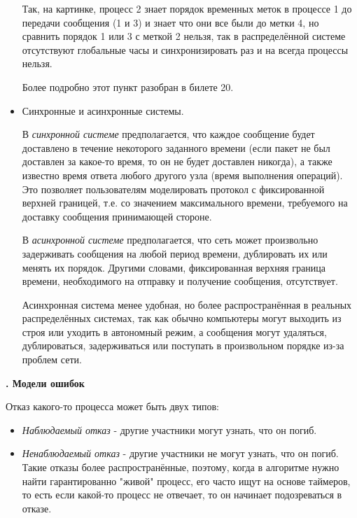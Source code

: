 \begin{itemize}
Так, на картинке, процесс 2 знает порядок временных меток в процессе 1 до передачи сообщения (1 и 3) и знает что они все были до метки 4, но сравнить порядок 1 или 3 с меткой 2 нельзя, так в распределённой системе отсутствуют глобальные часы и синхронизировать раз и на всегда процессы нельзя.
 
 Более подробно этот пункт разобран в билете 20.
 
\item  Синхронные и асинхронные системы.

\hspace{12px}В \textit{синхронной системе} предполагается, что каждое сообщение будет доставлено в течение некоторого заданного времени (если пакет не был доставлен за какое-то время, то он не будет доставлен никогда), а также известно время ответа любого другого узла (время выполнения операций).
Это позволяет пользователям моделировать протокол с фиксированной верхней границей, т.е. со значением максимального времени, требуемого на доставку сообщения принимающей стороне.

\hspace{12px}В \textit{асинхронной системе} предполагается, что сеть может произвольно задерживать сообщения на любой период времени, дублировать их или менять их порядок. Другими словами, фиксированная верхняя граница времени, необходимого на отправку и получение сообщения, отсутствует.

\hspace{12px} Асинхронная система менее удобная, но более распространённая в реальных распределённых системах, так как обычно компьютеры могут выходить из строя или уходить в автономный режим, а сообщения могут удаляться, дублироваться, задерживаться или поступать в произвольном порядке из-за проблем сети.
\end{itemize} 
\textbf{. Модели ошибок}

Отказ какого-то процесса может быть двух типов:
\begin{itemize}
\setlength\itemsep{0.0001em}
\item \textit{Наблюдаемый отказ}  -  другие участники могут узнать, что он погиб.
\item \textit{Ненаблюдаемый отказ}  - другие участники не могут узнать, что он погиб. Такие отказы более распространённые, поэтому, когда в алгоритме нужно найти гарантированно "живой" процесс, его часто ищут на основе таймеров, то есть если какой-то процесс не отвечает, то он начинает подозреваться в отказе.
\end{itemize}

